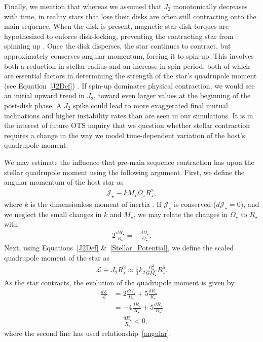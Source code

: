 \documentclass[twocolumn]{aastex63}
\begin{document}
Finally, we mention that whereas we assumed that $J_2$ monotonically decreases with time, in reality stars that lose their disks are often still contracting onto the main sequence. When the disk is present, magnetic star-disk torques are hypothesized to enforce disk-locking, preventing the contracting star from spinning up \citep{armitage1996magnetic,rebull2018rotation}. Once the disk disperses, the star continues to contract, but approximately conserves angular momentum, forcing it to spin-up. This involves both a reduction in stellar radius and an increase in spin period, both of which are essential factors in determining the strength of the star’s quadrupole moment (see Equation~\ref{J2Def}) . If spin-up dominates physical contraction, we would see an initial upward trend in $J_2$, toward even larger values at the beginning of the post-disk phase. A $J_2$ spike could lead to more exaggerated final mutual inclinations and higher instability rates than are seen in our simulations. It is in the interest of future OTS inquiry that we question whether stellar contraction requires a change in the way we model time-dependent variation of the host’s quadrupole moment.

We may estimate the influence that pre-main sequence contraction has upon the stellar quadrupole moment using the following argument. First, we define the angular momentum of the host star as
\begin{align}
    \mathcal{J}_\star \equiv k M_\star \Omega_\star R_\star^2,
\end{align}
where $k$ is the dimensionless moment of inertia \citep{1939MNRAS..99..451S}. If $\mathcal{J}_\star$ is conserved ($d\mathcal{J}_\star=0$), and we neglect the small changes in $k$ and $M_\star$, we may relate the changes in $\Omega_\star$ to $R_\star$ with
\begin{align}\label{angular}
2\frac{dR_\star}{R_\star}=-\frac{d\Omega_\star}{\Omega_\star}.
\end{align}
Next, using Equations~\ref{J2Def} \&~\ref{Stellar_Potential}, we define the scaled quadrupole moment of the star as
\begin{align}
   \mathcal{L}\equiv J_2 R_\star^2\approx \frac{1}{3}k_2 \frac{\Omega_\star^2}{GM_\star}R_\star^5.
\end{align}
As the star contracts, the evolution of the quadrupole moment is given by
\begin{align}
   \frac{d\mathcal{L}}{\mathcal{L}}&= 2\frac{d\Omega_\star}{\Omega_\star}+5\frac{dR_\star}{R_\star}\nonumber\\
   &=-4\frac{dR_\star}{R_\star}+5\frac{dR_\star}{R_\star}\nonumber\\
   &=\frac{dR_\star}{R_\star}<0,
\end{align}
where the second line has used relationship~\ref{angular}. 
\end{document}
